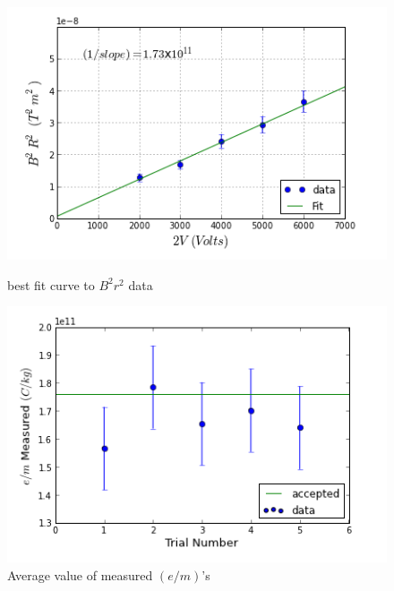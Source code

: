 \documentclass[prb,preprint]{revtex4-1}
\begin{document}
	\begin{figure}[h!]
		\centering
		\begin{minipage}{.5\textwidth}
			\raggedleft
			\includegraphics[width= \linewidth]{LinearFinal.png}
			\caption[width = .5\linewidth]{best fit curve to $B^2r^2$ data}
		\end{minipage}%
		\begin{minipage}{.5\textwidth}
			\raggedright
			\includegraphics[width=\linewidth]{emFinal.png}
			\caption{Average value of measured $(e/m)$'s}
			
		\end{minipage}
		\label{averages}
	\end{figure}
	
\end{document}
